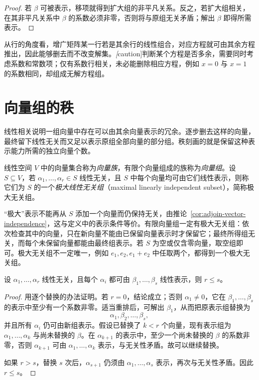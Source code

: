 \begin{proof}
若 $\beta$ 可被表示，移项就得到扩大组的非平凡关系。反之，若扩大组相关，在其非平凡关系中 $\beta$ 的系数必须非零，否则将与原组无关矛盾；解出 $\beta$ 即得所需表示。
\end{proof}

从行的角度看，增广矩阵某一行若是其余行的线性组合，对应方程就可由其余方程推出，因此能够删去而不改变解集。\emph[caution]{判断某个方程是否多余，需要同时考虑系数和常数项}；仅有系数行相关，未必能删除相应方程，例如 $x=0$ 与 $x=1$ 的系数相同，却组成无解方程组。

\section{向量组的秩}
\label{sec:vector-family-rank}

线性相关说明一组向量中存在可以由其余向量表示的冗余。逐步删去这样的向量，最终留下线性无关而又足以表示原组全部向量的部分组。秩刻画的就是保留这种表示能力所需的独立向量个数。

\begin{definition}
\label{def:maximal-independent-family}
线性空间 $V$ 中的向量集合称为\emph{向量族}，有限个向量组成的族称为\emph{向量组}。设 $S\subseteq V$，若 $\alpha_1,\ldots,\alpha_r\in S$ 线性无关，且 $S$ 中每个向量均可由它们线性表示，则称它们为 $S$ 的一个\emph{极大线性无关组}（maximal linearly independent subset），简称极大无关组。
\end{definition}

“极大”表示不能再从 $S$ 添加一个向量而仍保持无关，由推论~\ref{cor:adjoin-vector-independence}，这与定义中的表示条件等价。有限向量组一定有极大无关组：依次检查其中的向量，只在新向量不能由已保留向量表示时才保留它；最终所得组无关，而每个未保留向量都能由最终组表示。若 $S$ 为空或仅含零向量，取空组即可。极大无关组不一定唯一，例如 $e_1,e_2,e_1+e_2$ 中任取两个，都得到一个极大无关组。

\begin{lemma}[线性表示的个数比较]
\label{lem:independent-versus-spanning}
设 $\alpha_1,\ldots,\alpha_r$ 线性无关，且每个 $\alpha_i$ 都可由 $\beta_1,\ldots,\beta_s$ 线性表示，则 $r\leq s$。
\end{lemma}

\begin{proof}
用逐个替换的办法证明。若 $r=0$，结论成立；否则 $\alpha_1\ne0$，它在 $\beta_1,\ldots,\beta_s$ 的表示中至少有一个系数非零。适当重排后，可解出 $\beta_1$，从而把原表示组替换为
\[
    \alpha_1,\beta_2,\ldots,\beta_s,
\]
并且所有 $\alpha_i$ 仍可由新组表示。假设已替换了 $k<r$ 个向量，现有表示组为 $\alpha_1,\ldots,\alpha_k$ 与尚未替换的 $\beta$。在 $\alpha_{k+1}$ 的表示中，至少一个尚未替换的 $\beta$ 的系数非零，否则 $\alpha_{k+1}$ 可由 $\alpha_1,\ldots,\alpha_k$ 表示，与无关性矛盾。故可以继续替换。

如果 $r>s$，替换 $s$ 次后，$\alpha_{s+1}$ 仍须由 $\alpha_1,\ldots,\alpha_s$ 表示，再次与无关性矛盾。因此 $r\leq s$。
\end{proof}

